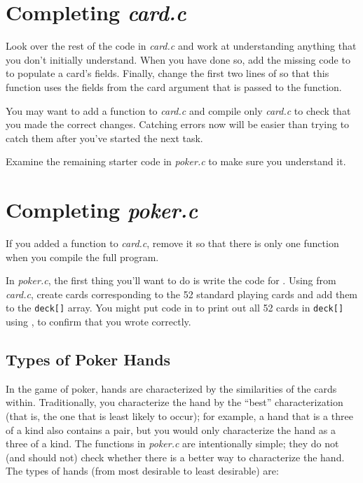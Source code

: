 \section{Completing \textit{card.c}}

Look over the rest of the code in \textit{card.c} and work at understanding
anything that you don't initially understand. When you have done so, add the
missing code to  to populate a card's fields.
Finally, change the first two lines of  so
that this function uses the fields from the card argument that is passed to the
function.

You may want to add a  function to \textit{card.c} and compile
only \textit{card.c} to check that you made the correct changes. Catching
errors now will be easier than trying to catch them after you've started the
next task.

Examine the remaining starter code in \textit{poker.c} to make sure you
understand it.

\section{Completing \textit{poker.c}}

If you added a  function to \textit{card.c}, remove it so that
there is only one  function when you compile the full program.

In \textit{poker.c}, the first thing you'll want to do is write the code for
. Using  from \textit{card.c},
create cards corresponding to the 52 standard playing cards and add them to the
\lstinline{deck[]} array. You might put code in  to print out
all 52 cards in \lstinline{deck[]} using , to confirm
that you wrote  correctly.

\subsection{Types of Poker Hands}

In the game of poker, hands are characterized by the similarities of the cards
within. Traditionally, you characterize the hand by the ``best''
characterization (that is, the one that is least likely to occur); for example,
a hand that is a three of a kind also contains a pair, but you would only
characterize the hand as a three of a kind. The  functions in
\textit{poker.c} are intentionally simple; they do not (and should not) check
whether there is a better way to characterize the hand. The types of hands
(from most desirable to least desirable) are:

